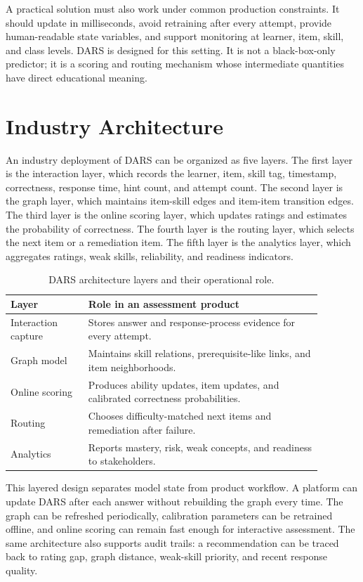 \documentclass[conference]{IEEEtran}
\begin{document}
A practical solution must also work under common production constraints. It should update in milliseconds, avoid retraining after every attempt, provide human-readable state variables, and support monitoring at learner, item, skill, and class levels. DARS is designed for this setting. It is not a black-box-only predictor; it is a scoring and routing mechanism whose intermediate quantities have direct educational meaning.

\section{Industry Architecture}
An industry deployment of DARS can be organized as five layers. The first layer is the interaction layer, which records the learner, item, skill tag, timestamp, correctness, response time, hint count, and attempt count. The second layer is the graph layer, which maintains item-skill edges and item-item transition edges. The third layer is the online scoring layer, which updates ratings and estimates the probability of correctness. The fourth layer is the routing layer, which selects the next item or a remediation item. The fifth layer is the analytics layer, which aggregates ratings, weak skills, reliability, and readiness indicators.

\begin{table}[t]
\caption{DARS architecture layers and their operational role.}
\label{tab:architecture}
\centering
\begin{tabular}{p{0.22\linewidth}p{0.66\linewidth}}
\toprule
\textbf{Layer} & \textbf{Role in an assessment product} \\
\midrule
Interaction capture & Stores answer and response-process evidence for every attempt. \\
Graph model & Maintains skill relations, prerequisite-like links, and item neighborhoods. \\
Online scoring & Produces ability updates, item updates, and calibrated correctness probabilities. \\
Routing & Chooses difficulty-matched next items and remediation after failure. \\
Analytics & Reports mastery, risk, weak concepts, and readiness to stakeholders. \\
\bottomrule
\end{tabular}
\end{table}

This layered design separates model state from product workflow. A platform can update DARS after each answer without rebuilding the graph every time. The graph can be refreshed periodically, calibration parameters can be retrained offline, and online scoring can remain fast enough for interactive assessment. The same architecture also supports audit trails: a recommendation can be traced back to rating gap, graph distance, weak-skill priority, and recent response quality.
\end{document}
